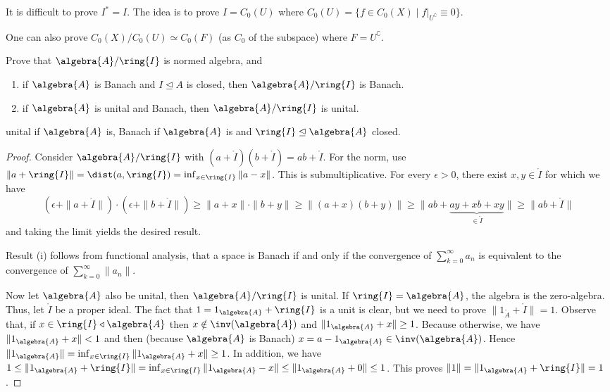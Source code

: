 \documentclass[a4paper]{article}
\begin{document}
\begin{exercise}[1.8]
	It is difficult to prove $I^* = I$. The idea is to prove $I = C_0(U)$ where $C_0(U) = \{ f \in C_0(X) \mid f|_{U^\complement} \equiv 0 \}$. 

	One can also prove $C_0(X)/C_0(U) \simeq C_0(F)$ (as $C_0$ of the subspace) where $F = U^\complement$.
\end{exercise}

\begin{exercise}
	Prove that $\algebra{A}/\ring{I}$ is normed algebra, and
	\begin{enumerate}
		\item if $\algebra{A}$ is Banach and $I \trianglelefteq A$ is closed, then $\algebra{A} / \ring{I}$ is Banach.
		\item if $\algebra{A}$ is unital and Banach, then $\algebra{A} / \ring{I}$ is unital.
	\end{enumerate}
	
	unital if $\algebra{A}$ is, Banach if $\algebra{A}$ is and $\ring{I} \trianglelefteq \algebra{A}$ closed.
\end{exercise}

\begin{proof}
	Consider $\algebra{A}/\ring{I}$ with $(a + \ring{I})(b + \ring{I}) = ab + \ring{I}$.
	For the norm, use $\|a + \ring{I}\| = \dist(a, \ring{I}) = \inf_{x \in \ring{I}} \|a - x\|$.
	This is submultiplicative. For every $\epsilon > 0$, there exist $x,y \in \ring{I}$ for which we have
	\begin{equation*}
		(\epsilon + \|a + \ring{I}\|) \cdot (\epsilon + \|b + \ring{I}\|) \geq \|a + x\| \cdot \|b + y\| \geq \|(a+x)(b+y) \| \geq \|ab + \underbrace{ay + xb + xy}_{\in \ring{I}} \| \geq \|ab + \ring{I}\|
	\end{equation*}
	and taking the limit yields the desired result.

	Result (i) follows from functional analysis, that a space is Banach if and only if the convergence of $\sum_{k = 0}^{\infty} a_n$ is equivalent to the convergence of $\sum_{k =0}^{\infty} \|a_n\|$.

	Now let $\algebra{A}$ also be unital, then $\algebra{A} / \ring{I}$ is unital.
	If $\ring{I} = \algebra{A}$, the algebra is the zero-algebra.
	Thus, let $\ring{I}$ be a proper ideal.
	The fact that $1 = 1_\algebra{A} + \ring{I}$ is a unit is clear, but we need to prove $\| 1_\ring{A} + \ring{I}\| = 1$.
	Observe that, if $x \in \ring{I} \triangleleft \algebra{A}$ then $x \notin \inv(\algebra{A})$ and $\|1_\algebra{A} + x\| \geq 1$.
	Because otherwise, we have $\| 1_\algebra{A} + x \| < 1$ and then (because $\algebra{A}$ is Banach) $x = a - 1_\algebra{A} \in \inv(\algebra{A})$.
	Hence $\|1_\algebra{A}\| = \inf_{x \in \ring{I}} \|1_\algebra{A} + x \| \geq 1$.
	In addition, we have $1 \leq \|1_\algebra{A} + \ring{I}\| = \inf_{x \in \ring{I}} \|1_\algebra{A} - x \| \leq \|1_\algebra{A} + 0\| \leq 1$. This proves $\|1\| = \|1_\algebra{A} + \ring{I}\| = 1$.
\end{proof}
\end{document}
